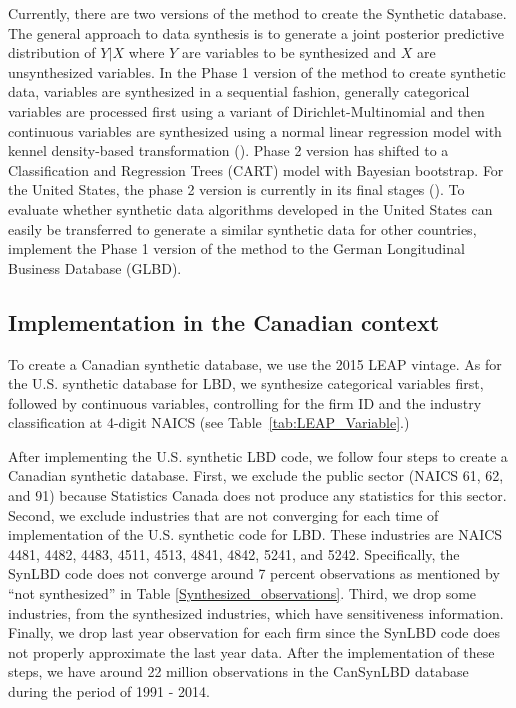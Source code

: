 \documentclass{article}
\begin{document}
Currently, there are two versions of the method to create the Synthetic database. The general approach to data synthesis is to generate a joint posterior predictive distribution of $Y|X$ where $Y$ are variables to be synthesized and $X$ are unsynthesized variables. In the Phase 1 version of the method to create synthetic data, variables are synthesized in a sequential fashion, generally categorical variables are processed first using a variant of Dirichlet-Multinomial and then continuous variables are synthesized using a normal linear regression model with kennel density-based transformation (\textcite{WOODCOCK20094228}). Phase 2 version has shifted to a Classification and Regression Trees (CART) model with Bayesian bootstrap. For the United States, the phase 2 version  is currently in its final stages (\textcite{RePEc:cen:wpaper:14-12}). To evaluate whether synthetic data algorithms developed in the United States can easily be transferred to generate a similar synthetic data for other countries, \textcite{RePEc:cen:wpaper:14-13} implement the Phase 1 version of the method to the German Longitudinal Business Database (GLBD). 



\subsection{Implementation in the Canadian context}
To create a  Canadian synthetic database, we use the 2015 LEAP vintage. As for the U.S. synthetic database for LBD, we synthesize categorical variables first, followed by continuous variables, controlling for the firm ID and the industry classification at 4-digit NAICS (see Table~\ref{tab:LEAP_Variable}.)


After implementing the U.S. synthetic LBD code, we follow four steps to create a Canadian synthetic database. First, we exclude the public sector (NAICS 61, 62, and 91) because Statistics Canada does not produce any statistics for this sector. Second, we exclude industries that are not converging for each time of implementation of the U.S. synthetic code for LBD. These industries are NAICS 4481,    4482,     4483,     4511,     4513,     4841,     4842,     5241, and 5242. Specifically, the SynLBD code does not converge around 7 percent observations as mentioned by ``not synthesized'' in Table \ref{Synthesized_observations}. Third, we drop some industries, from the synthesized industries, which have sensitiveness information. Finally, we drop last year observation for each firm since the SynLBD code does not properly approximate the last year data. After the implementation of these steps, we have around 22 million observations in the CanSynLBD database during the period of 1991 - 2014. 
\end{document}
